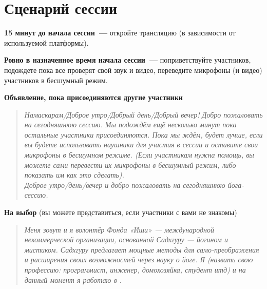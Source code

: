 \newpage
\section*{Сценарий сессии}
\label{sec:plan}

\textbf{15 минут до начала сессии~---} откройте трансляцию (в зависимости от используемой платформы). 

\textbf{Ровно в назначенное время начала сессии~---} поприветствуйте участников, подождете пока все проверят свой звук и видео, переведите микрофоны (и видео) участников в бесшумный режим.

\textbf{Объявление, пока присоединяются другие участники}
\begin{quote}\emph{
Намаскарам/Доброе утро/Добрый день/Добрый вечер!
Добро пожаловать на сегодняшнюю сессию. Мы подождём ещё несколько
минут пока остальные участники присоединяются. Пока мы ждём, будет
лучше, если вы будете использовать наушники для участия в сессии и
оставите свои микрофоны в бесшумном режиме. (Если участникам нужна
помощь, вы можете сами перевести их микрофоны в бесшумный режим,
либо показать им как это сделать).
\\[3pt]
Доброе утро/день/вечер и добро пожаловать на сегодняшнюю
йога-сессию.
}\end{quote}

\textbf{На выбор} (вы можете представиться, если участники с вами не знакомы)
\begin{quote}\emph{
Меня зовут \underline{\qquad} и я волонтёр Фонда «Иши» — международной
некоммерческой организации, основанной Садхгуру — йогином и
мистиком. Садхгуру предлагает мощные методы для само-преображения и
расширения своих возможностей через науку о йоге.
Я (назвать свою профессию: программист, инженер, домохозяйка, студент
итд) и на данный момент я работаю в \underline{\qquad}.
}\end{quote}

